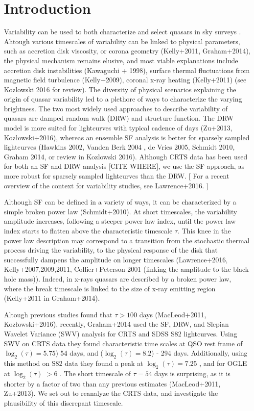 \documentclass[fleqn,usenatbib]{mnras}  %
\begin{document}
\section{Introduction}
Variability can be used to both characterize and select quasars  in sky surveys . Ahtough various timescales of variability can be linked to physical parameters, such as accretion disk viscosity, or corona geometry (Kelly+2011, Graham+2014), the physical mechanism remains elusive, and most viable explanations include accretion disk instabilities (Kawaguchi + 1998), surface thermal fluctuations from magnetic field turbulence (Kelly+2009), coronal x-ray heating (Kelly+2011) (see Kozlowski 2016 for review).
The diversity of  physical scenarios explaining  the origin of quasar variability led to a  plethore of ways to characterize the varying brightness. The two most widely used approaches to describe variability of quasars  are damped random walk (DRW) and structure function. The DRW model is more suited for lightcurves with typical cadence of days (Zu+2013, Koz\l{}owski+2016), whereas an ensemble SF analysis is better for sparsely sampled lightcurves (Hawkins 2002, Vanden Berk 2004 , de Vries 2005, Schmidt 2010, Graham 2014, or review in Kozlowski 2016). Although CRTS data has been used for both an SF and DRW analysis [CITE WHERE],  we use the SF approach, as more robust for sparsely sampled lightcurves than the DRW. [ For a recent overview of the context for variability studies, see Lawrence+2016. ]

Although SF can be defined  in a variety of ways, it can be characterized by a simple broken power law (Schmidt+2010). At short timescales,  the variability amplitude increases, following a steeper power law index,  until the power law index starts to flatten  above the characteristic timescale  $\tau$.   This knee in the power law  description may correspond to a transition from the stochastic thermal  process driving  the variability, to the physical response of the disk that successfully  dampens the amplitude on longer timescales (Lawrence+2016,  Kelly+2007,2009,2011, Collier+Peterson 2001 (linking the amplitude to the black hole mass)). Indeed,  in x-rays quasars are described by a broken  power law, where the  break timescale is linked to the size of x-ray emitting region (Kelly+2011 in Graham+2014). 

Altough previous studies found that  $\tau > 100$ days  (MacLeod+2011,  Koz\l{}owski+2016), recently, Graham+2014 used the SF, DRW, and Slepian Wavelet Variance (SWV) analysis for CRTS and SDSS S82 lightcurves. Using SWV on CRTS data they found characteristic time scales at   QSO rest frame of $\log_{2}(\tau) = 5.75$)  54 days,  and ($\log_{2}(\tau)=8.2$) -  294 days. Additionally, using this method on S82 data they found a peak at $\log_{2}(\tau) = 7.25$ , and for OGLE  at $\log_{2}(\tau)$ $> 6$ . The short timescale of   $\tau = 54$ days is surprising, as it is shorter by a factor of two than any previous estimates (MacLeod+2011, Zu+2013). We set out to reanalyze the CRTS data, and investigate the plausibility of this discrepant timescale. 
\end{document}
